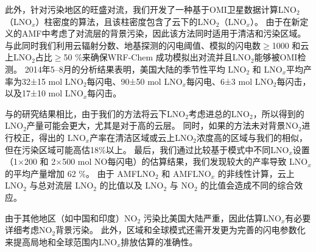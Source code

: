 此外，针对污染地区的旺盛对流，我们开发了一种基于OMI卫星数据计算LNO$_2$（LNO$_x$）柱密度的算法，且该柱密度包含了云下的LNO$_2$（LNO$_x$）。
由于在新定义的AMF中考虑了对流层的背景污染，因此该方法同时适用于清洁和污染区域。
与此同时我们利用云辐射分数、地基探测的闪电阈值、模拟的闪电数$\geq$1000 和云上LNO$_2$占比$\geq$50 \%来确保WRF-Chem 成功模拟出对流并且LNO$_2$能够被OMI检测。
2014年5--8月的分析结果表明，美国大陆的季节性平均 LNO$_2$ 和 LNO$_x$平均产率为32±15 mol LNO$_2$每闪电、90±50 mol LNO$_x$每闪电、6±3 mol LNO$_2$每闪击，以及17±10 mol LNO$_x$每闪击。

与\citet{Lapierre.2020}的研究结果相比，由于我们的方法将云下LNO$_2$考虑进总的LNO$_2$，所以得到的LNO$_2$产量可能会更大，尤其是对于高的云层。
同时，如果\citet{Pickering.2016}的方法未对背景NO$_2$进行校正，得出的 LNO$_x$产率在清洁区域或云上LNO$_2$浓度高的区域与我们的相似，但在污染区域可能高估18\%以上。
最后，我们通过比较基于模式中不同LNO$_x$设置（1$\times$200 和 2$\times$500 mol NO每闪电）的估算结果，我们发现较大的产率导致 LNO$_x$ 的平均产量增加 62 \%。
由于 AMFLNO$_2$ 和 AMFLNO$_x$  的非线性计算，云上LNO$_2$ 与总对流层 LNO$_2$ 的比值以及 LNO$_2$ 与 NO$_2$ 的比值会造成不同的综合效应。

由于其他地区（如中国和印度）NO$_2$ 污染比美国大陆严重，因此估算LNO$_x$有必要详细考虑NO$_2$背景污染。
此外，区域和全球模式还需开发更为完善的闪电参数化来提高局地和全球范围内LNO$_x$排放估算的准确性。
